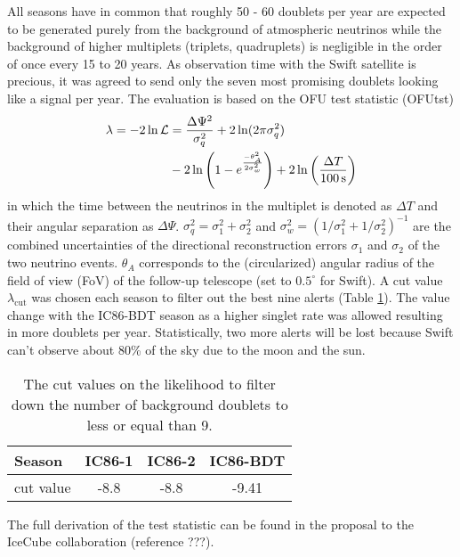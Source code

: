 All seasons have in common that roughly 50 - 60  doublets per 
year are expected to be generated purely from the background of atmospheric 
neutrinos while the background of higher multiplets (triplets, quadruplets) is 
negligible in the order of once every 15 to 20 years. As observation time with 
the Swift satellite is precious, it was agreed to send only the seven most 
promising doublets looking like a signal per year. The evaluation is based on 
the OFU test 
statistic (OFUtst)
\begin{align}
    \begin{split}
    \lambda = -2 \ln \mathcal{L} &= \frac{\Delta\Psi^2}{\sigma_q^2} + 2 \ln(2
\pi \sigma_q^2) \\
                              &- 2 \ln\left( 1 -
e^{\frac{-\theta_A^2}{2\sigma_w^2}}\right) 
                              + 2 \ln\left( \frac{\Delta T}{\unit[100]{s}}
\right)
    \end{split}
  \label{eq:alert-llh}
\end{align}
in which the time between the neutrinos in the multiplet is denoted as $\Delta 
T$
and their angular separation as $\Delta\Psi$. $\sigma_q^2 = \sigma_1^2 +
\sigma_2^2$ and $\sigma_w^2 = \left(1/\sigma_1^2 + 1/\sigma_2^2\right)^{-1}$
 are the combined uncertainties of the directional
reconstruction errors $\sigma_1$ and $\sigma_2$ of the two neutrino events.
$\theta_A$ corresponds to the (circularized) angular radius of the field
of view (FoV) of the follow-up telescope (set to $0.5^\circ$ for Swift). A cut 
value $\lambda_\text{cut}$ was chosen each season to filter out the best nine 
alerts (Table \ref{tab:llh cut values}). The value change with the IC86-BDT 
season as a higher singlet rate was allowed resulting in more doublets per 
year. Statistically, two more alerts will be 
lost because Swift can't observe about 80\% of the sky due to the moon and the 
sun.

\begin{table}[h]
  \centering
  \begin{tabular}{l|c|c|c}
   Season & IC86-1 & IC86-2 & IC86-BDT \\
\hline
   cut value & -8.8  & -8.8 & -9.41 \\
  \end{tabular}
  \caption{The cut values on the likelihood to filter down the number of
background doublets to less or equal than 9.}
  \label{tab:llh cut values}
\end{table}
The full derivation of the test statistic can be found in the proposal to the 
IceCube collaboration (reference ???).


